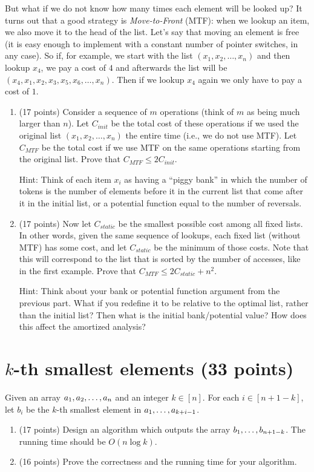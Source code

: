 \documentclass[11pt]{article}
\begin{document}
But what if we do not know how many times each element will be looked up?  It turns out that a good strategy is \emph{Move-to-Front} (MTF): when we lookup an item, we also move it to the head of the list.  Let's say that moving an element is free (it is easy enough to implement with a constant number of pointer switches, in any case).  So if, for example, we start with the list $(x_1, x_2, \dots, x_n)$ and then lookup $x_4$, we pay a cost of $4$ and afterwards the list will be $(x_4, x_1, x_2, x_3, x_5, x_6, \dots, x_n)$.  Then if we lookup $x_4$ again we only have to pay a cost of $1$.  

\begin{enumerate}

\item (17 points) Consider a sequence of $m$ operations (think of $m$ as being much larger than $n$).  Let $C_{init}$ be the total cost of these operations if we used the original list $(x_1, x_2, \dots, x_n)$ the entire time (i.e., we do not use MTF).  Let $C_{MTF}$ be the total cost if we use MTF on the same operations starting from the original list.  Prove that $C_{MTF} \leq 2 C_{init}$.  

Hint: Think of each item $x_i$ as having a ``piggy bank'' in which the number of tokens is the number of elements before it in the current list that come after it in the initial list, or a potential function equal to the number of reversals.  


\item (17 points) Now let $C_{static}$ be the smallest possible cost among all fixed lists.  In other words, given the same sequence of lookups, each fixed list (without MTF) has some cost, and let $C_{static}$ be the minimum of those costs.  Note that this will correspond to the list that is sorted by the number of accesses, like in the first example.  Prove that $C_{MTF} \leq 2C_{static} + n^2$.

Hint: Think about your bank or potential function argument from the previous part.  What if you redefine it to be relative to the optimal list, rather than the initial list?  Then what is the initial bank/potential value?  How does this affect the amortized analysis?

\end{enumerate}



\section{$k$-th smallest elements (33 points)}
Given an array $a_1,a_2,\mathellipsis,a_n$ and an integer $k\in[n]$. For each $i\in[n+1-k]$, let $b_i$ be the $k$-th smallest element in $a_1,\mathellipsis,a_{k+i-1}$.

\begin{enumerate}
\item (17 points) Design an algorithm which outputs the array $b_1,\mathellipsis,b_{n+1-k}$. The running time should be $O(n\log k)$.

\item (16 points) Prove the correctness and the running time for your algorithm.

\end{enumerate}
\end{document}
